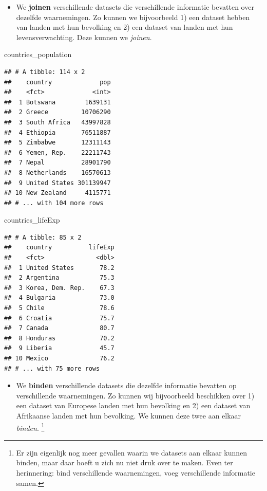 \documentclass[]{tufte-book}
\newenvironment{Shaded}{}{}
\newcommand{\NormalTok}[1]{#1}
\providecommand{\tightlist}{%
  \setlength{\itemsep}{0pt}\setlength{\parskip}{0pt}}
\begin{document}
\begin{itemize}
\tightlist
\item
  We \textbf{joinen} verschillende datasets die verschillende informatie bevatten over dezelfde waarnemingen. Zo kunnen we bijvoorbeeld 1) een dataset hebben van landen met hun bevolking en 2) een dataset van landen met hun levensverwachting. Deze kunnen we \emph{joinen}.
\end{itemize}

\begin{Shaded}
\begin{Highlighting}[]
\NormalTok{countries\_population}
\end{Highlighting}
\end{Shaded}

\begin{verbatim}
## # A tibble: 114 x 2
##    country             pop
##    <fct>             <int>
##  1 Botswana        1639131
##  2 Greece         10706290
##  3 South Africa   43997828
##  4 Ethiopia       76511887
##  5 Zimbabwe       12311143
##  6 Yemen, Rep.    22211743
##  7 Nepal          28901790
##  8 Netherlands    16570613
##  9 United States 301139947
## 10 New Zealand     4115771
## # ... with 104 more rows
\end{verbatim}

\begin{Shaded}
\begin{Highlighting}[]
\NormalTok{countries\_lifeExp}
\end{Highlighting}
\end{Shaded}

\begin{verbatim}
## # A tibble: 85 x 2
##    country          lifeExp
##    <fct>              <dbl>
##  1 United States       78.2
##  2 Argentina           75.3
##  3 Korea, Dem. Rep.    67.3
##  4 Bulgaria            73.0
##  5 Chile               78.6
##  6 Croatia             75.7
##  7 Canada              80.7
##  8 Honduras            70.2
##  9 Liberia             45.7
## 10 Mexico              76.2
## # ... with 75 more rows
\end{verbatim}

\begin{itemize}
\tightlist
\item
  We \textbf{binden} verschillende datasets die dezelfde informatie bevatten op verschillende waarnemingen. Zo kunnen wij bijvoorbeeld beschikken over 1) een dataset van Europese landen met hun bevolking en 2) een dataset van Afrikaanse landen met hun bevolking. We kunnen deze twee aan elkaar \emph{binden}. \footnote{Er zijn eigenlijk nog meer gevallen waarin we datasets aan elkaar kunnen binden, maar daar hoeft u zich nu niet druk over te maken. Even ter herinnering: bind verschillende waarnemingen, voeg verschillende informatie samen.}
\end{itemize}
\end{document}

